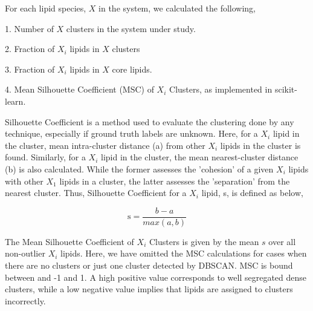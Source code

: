 \documentclass[10pt]{article}
\begin{document}
For each lipid species, $X$ in the system, we calculated the following, 

1. Number of $X$ clusters in the system under study.

2. Fraction of $X_i$ lipids in $X$ clusters

3. Fraction of $X_i$ lipids in $X$ core lipids.

4. Mean Silhouette Coefficient (MSC) of $X_i$ Clusters, as implemented in scikit-learn.

Silhouette Coefficient is a method used to evaluate the clustering done by any technique, especially if ground truth labels are unknown. 
Here, for a $X_i$ lipid in the cluster, mean intra-cluster distance (a) from other $X_i$ lipids in the cluster is found.  
Similarly, for a $X_i$ lipid in the cluster, the mean nearest-cluster distance (b) is also calculated.
While the former assesses the 'cohesion' of a given $X_i$ lipids with other $X_1$ lipids in a cluster, the latter assesses the 'separation' from the nearest cluster.
Thus, Silhouette Coefficient for a $X_i$ lipid, s, is defined as below,

\begin{equation}
\label{eq:SC}
\text{s} = \frac{b - a}{max(a,b)}
\end{equation}

The Mean Silhouette Coefficient of $X_i$ Clusters is given by the mean $s$ over all non-outlier $X_i$ lipids.
Here, we have omitted the MSC calculations for cases when there are no clusters or just one cluster detected by DBSCAN. 
MSC is bound between and -1 and 1.
A high positive value corresponds to well segregated dense clusters, while a low negative value implies that lipids are assigned to clusters incorrectly.  



\end{document}

